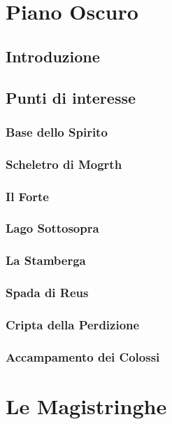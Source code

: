 \documentclass[10pt,twoside,onecolumn,openany]{book}
\begin{document}
\chapter{Piano Oscuro}
\section{Introduzione}
\newpage
\section{Punti di interesse}
\subsection{Base dello Spirito}
\newpage
\subsection{Scheletro di Mogrth}
\newpage
\subsection{Il Forte}
\newpage
\subsection{Lago Sottosopra}
\newpage
\subsection{La Stamberga}
\newpage
\subsection{Spada di Reus}
\newpage
\subsection{Cripta della Perdizione}
\newpage
\subsection{Accampamento dei Colossi}
\newpage
\chapter{Le Magistringhe}
\end{document}
